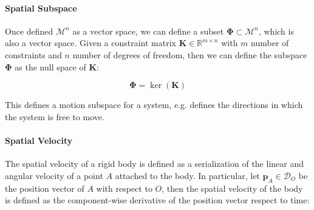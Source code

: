 \begin{figure}
\end{figure}

\paragraph{Spatial Subspace} Once defined $\mathcal{M} ^n$ as a vector space, we can define a subset $\boldsymbol{\Phi} \subset \mathcal{M} ^n$, which is also a vector space. Given a constraint matrix $\mathbf{K} \in \mathbb{R} ^{m \times n}$ with $m$ number of constraints and $n$ number of degrees of freedom, then we can define the subspace $\boldsymbol{\Phi}$ as the null space of $\mathbf{K}$:

\begin{equation}
    \boldsymbol{\Phi} = \ker (\mathbf{K})
\end{equation}

This defines a motion subspace for a system, e.g. defines the directions in which the system is free to move.

\paragraph{Spatial Velocity} The spatial velocity of a rigid body is defined as a serialization of the linear and angular velocity of a point $A$ attached to the body. In particular, let $\mathbf{p} _A \in \mathcal{D}_O$ be the position vector of $A$ with respect to $O$, then the spatial velocity of the body is defined as the component-wise derivative of the position vector respect to time:

